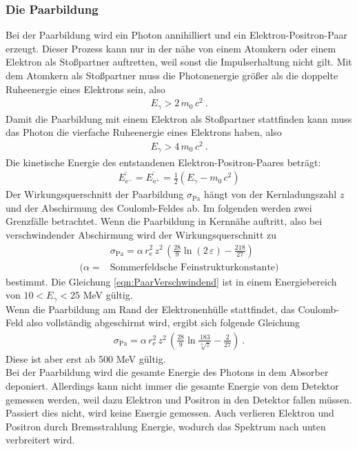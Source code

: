 \subsubsection{Die Paarbildung}
Bei der Paarbildung wird ein Photon annihilliert und ein Elektron-Positron-Paar erzeugt. Dieser Prozess kann nur in der nähe von einem Atomkern oder einem Elektron als Stoßpartner auftretten, weil sonst die Impulserhaltung nicht gilt. Mit dem Atomkern als Stoßpartner muss die Photonenergie größer als die doppelte Ruheenergie eines Elektrons sein, also
\begin{align*}
	E_{\gamma} > 2\,m_0\,c^2 \ .
\end{align*}
Damit die Paarbildung mit einem Elektron als Stoßpartner stattfinden kann muss das Photon die vierfache Ruheenergie eines Elektrons haben, also
\begin{align*}
	E_{\gamma} > 4\,m_0\,c^2 \ .
\end{align*}
Die kinetische Energie des entstandenen Elektron-Positron-Paares beträgt:
\begin{align}
	\overline{E_{\text{e}^-}} = \overline{E_{\text{e}^+}} = \frac{1}{2}(E_{\gamma} - m_0\,c^2)
\end{align}
Der Wirkungsquerschnitt der Paarbildung $\sigma_\text{Pa}$ hängt von der Kernladungszahl $z$ und der Abschirmung des Coulomb-Feldes ab. Im folgenden werden zwei Grenzfälle betrachtet. Wenn die Paarbildung in Kernnähe auftritt, also bei verschwindender Abschirmung wird der Wirkungsquerschnitt zu
\begin{align}
	&\sigma_\text{Pa} = \alpha\, r_\text{e}^2\, z^2\, \left(\frac{28}{9}\ln(2\,\varepsilon) - \frac{218}{27} \right) \\
	(\alpha = &\text{Sommerfeldsche Feinstrukturkonstante})
	\label{eqn:PaarVerschwindend}
\end{align}
bestimmt. Die Gleichung \eqref{eqn:PaarVerschwindend} ist in einem Energiebereich von $10 < E_\gamma < 25$ MeV gültig. \\
Wenn die Paarbildung am Rand der Elektronenhülle stattfindet, das Coulomb-Feld also vollständig abgeschirmt wird, ergibt sich folgende Gleichung
\begin{align}
	\sigma_\text{Pa} = \alpha\, r_\text{e}^2\, z^2\, \left(\frac{28}{9}\ln\frac{183}{\sqrt[3]{z}} - \frac{2}{27} \right) \ .
\end{align}
Diese ist aber erst ab 500 MeV gültig. \\
Bei der Paarbildung wird die gesamte Energie des Photons in dem Absorber deponiert. Allerdings kann nicht immer die gesamte Energie von dem Detektor gemessen werden, weil dazu Elektron und Positron in den Detektor fallen müssen. Passiert dies nicht, wird keine Energie gemessen. Auch verlieren Elektron und Positron durch Bremsstrahlung Energie, wodurch das Spektrum nach unten verbreitert wird.



